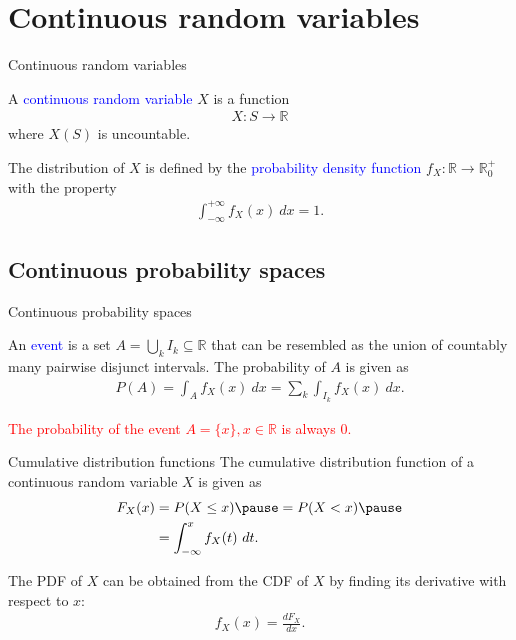 \documentclass{beamer}
\def\padding{\vspace{0.5cm}}
\def\spadding{\vspace{0.25cm}}
\def\b{\textcolor{blue}}
\def\r{\textcolor{red}}
\begin{document}
\section{Continuous random variables}
\begin{frame}{Continuous random variables}
    \begin{definition}
        A \b{continuous random variable} $X$ is a function
        \begin{align*}
            X: S \to \mathbb{R}
        \end{align*}
        where $X(S)$ is uncountable.\pause\par\spadding
        The distribution of $X$ is defined by the \b{probability density function} $f_X: \mathbb{R} \to \mathbb{R}_0^+$ with the property
        \begin{align*}
            \int_{- \infty}^{+ \infty} f_X(x)\ dx = 1.
        \end{align*}
    \end{definition}
\end{frame}

\subsection{Continuous probability spaces}
\begin{frame}{Continuous probability spaces}
    \begin{definition}
        An \b{event} is a set $A = \bigcup_k I_k \subseteq \mathbb{R}$ that can be resembled as the union of countably many pairwise disjunct intervals. The probability of $A$ is given as
        \begin{align*}
            P(A) = \int_A f_X(x)\ dx = \sum_k \int_{I_k} f_X(x)\ dx.
        \end{align*}
    \end{definition}\pause\par\padding
    \r{The probability of the event $A = \{x\}, x \in \mathbb{R}$ is always $0$.}
\end{frame}

\begin{frame}
    \begin{block}{Cumulative distribution functions}
        The cumulative distribution function of a continuous random variable $X$ is given as
        \begin{align*}
            F_X(x) &= P(X \leq x)\pause = P(X < x)\pause \\
                   &= \int_{- \infty}^x f_X(t)\ dt.
        \end{align*}\pause\par\spadding
        The PDF of $X$ can be obtained from the CDF of $X$ by finding its derivative with respect to $x$:
        \begin{align*}
            f_X(x) = \frac{dF_X}{dx}.
        \end{align*}
    \end{block}
\end{frame}
\end{document}
